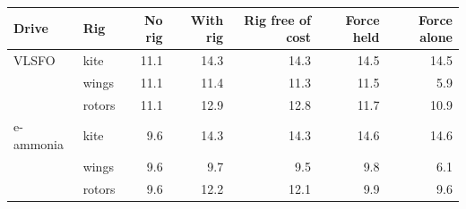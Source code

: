 \begin{tabular}{@{}llrrrrr@{}}
\toprule
Drive & Rig & No rig & With rig & Rig free of cost & Force held & Force alone \\
\midrule
VLSFO & kite & 11.1 & 14.3 & 14.3 & 14.5 & 14.5 \\
 & wings & 11.1 & 11.4 & 11.3 & 11.5 & 5.9 \\
 & rotors & 11.1 & 12.9 & 12.8 & 11.7 & 10.9 \\
e-ammonia & kite & 9.6 & 14.3 & 14.3 & 14.6 & 14.6 \\
 & wings & 9.6 & 9.7 & 9.5 & 9.8 & 6.1 \\
 & rotors & 9.6 & 12.2 & 12.1 & 9.9 & 9.6 \\
\bottomrule
\end{tabular}
